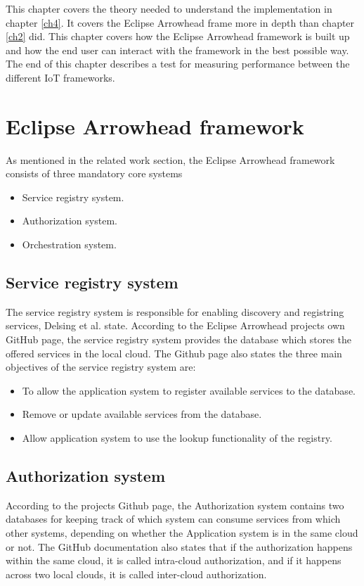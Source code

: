 This chapter covers the theory needed to understand the implementation in chapter \ref{ch4}. 
It covers the Eclipse Arrowhead frame more in depth than chapter \ref{ch2} did.
This chapter covers how the Eclipse Arrowhead framework is built up and how the end user can interact with the framework in the best possible way.
The end of this chapter describes a test for measuring performance between the different IoT frameworks.
\section{Eclipse Arrowhead framework} 
As mentioned in the related work section, the Eclipse Arrowhead framework consists of three mandatory core systems
\begin{itemize}
    \item Service registry system.
    \item Authorization system. 
    \item Orchestration system.
\end{itemize} 
\subsection{Service registry system}
The service registry system is responsible for enabling discovery and registring services, Delsing et al. state. 
According to the Eclipse Arrowhead projects own GitHub page, the service registry system provides the database which stores the offered services in the local cloud.\cite{Github2021}
The Github page also states the three main objectives of the service registry system are:
\begin{itemize}
    \item To allow the application system to register available services to the database. 
    \item Remove or update available services from the database.
    \item Allow application system to use the lookup functionality of the registry.
\end{itemize}
\subsection{Authorization system}
According to the projects Github page, the Authorization system contains two databases for keeping track of which system can consume services from which other systems, depending on whether the Application system is in the same cloud or not.
The GitHub documentation also states that if the authorization happens within the same cloud, it is called intra-cloud authorization, and if it happens across two local clouds, it is called inter-cloud authorization.\cite{Github2021}
